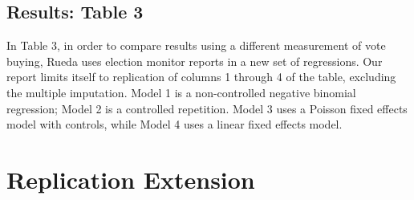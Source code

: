\documentclass[12pt]{article}
\begin{document}
\FloatBarrier

\subsection{Results: Table 3}

In Table 3, in order to compare results using a different measurement of vote buying, Rueda uses election monitor reports in a new set of regressions. Our report limits itself to replication of columns 1 through 4 of the table, excluding the multiple imputation. Model 1 is a non-controlled negative binomial regression; Model 2 is a controlled repetition. Model 3 uses a Poisson fixed effects model with controls, while Model 4 uses a linear fixed effects model.

\singlespacing
\FloatBarrier
\begin{table}[]
    \caption*{Simple Replication of Table 3}
    \centering
{}
\end{table}
\FloatBarrier

\section{Replication Extension}
\doublespacing
\end{document}

